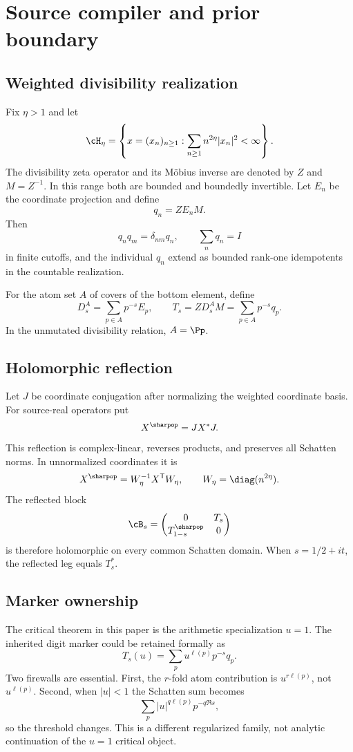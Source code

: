 \section{Source compiler and prior boundary}
\label{sec:source}

\subsection{Weighted divisibility realization}

Fix $\eta>1$ and let
\[
 \cH_\eta=
 \left\{x=(x_n)_{n\ge1}:
 \sum_{n\ge1}n^{2\eta}|x_n|^2<\infty\right\}.
\]
The divisibility zeta operator and its M\"obius inverse are denoted by
$Z$ and $M=Z^{-1}$.  In this range both are bounded and boundedly
invertible.  Let $E_n$ be the coordinate projection and define
\[
 q_n=ZE_nM.
\]
Then
\[
 q_nq_m=\delta_{nm}q_n,\qquad
 \sum_nq_n=I
\]
in finite cutoffs, and the individual $q_n$ extend as bounded
rank-one idempotents in the countable realization.

For the atom set $A$ of covers of the bottom element, define
\[
 D_s^A=\sum_{p\in A}p^{-s}E_p,
 \qquad
 T_s=ZD_s^AM=\sum_{p\in A}p^{-s}q_p.
\]
In the unmutated divisibility relation, $A=\Pp$.

\subsection{Holomorphic reflection}

Let $J$ be coordinate conjugation after normalizing the weighted
coordinate basis.  For source-real operators put
\[
 X^{\sharpop}=JX^*J.
\]
This reflection is complex-linear, reverses products, and preserves
all Schatten norms.  In unnormalized coordinates it is
\[
 X^{\sharpop}=W_\eta^{-1}X^{\mathsf T}W_\eta,
 \qquad W_\eta=\diag(n^{2\eta}).
\]
The reflected block
\[
 \cB_s=
 \begin{pmatrix}
 0&T_s\\T_{1-s}^{\sharpop}&0
 \end{pmatrix}
\]
is therefore holomorphic on every common Schatten domain.  When
$s=1/2+it$, the reflected leg equals $T_s^*$.

\subsection{Marker ownership}
\label{subsec:marker}

The critical theorem in this paper is the arithmetic specialization
$u=1$.  The inherited digit marker could be retained formally as
\[
 T_s(u)=\sum_pu^{\ell(p)}p^{-s}q_p.
\]
Two firewalls are essential.  First, the $r$-fold atom contribution is
$u^{r\ell(p)}$, not $u^{\ell(p)}$.  Second, when $|u|<1$ the Schatten
sum becomes
\[
 \sum_p|u|^{q\ell(p)}p^{-q\Re s},
\]
so the threshold changes.  This is a different regularized family,
not analytic continuation of the $u=1$ critical object.

